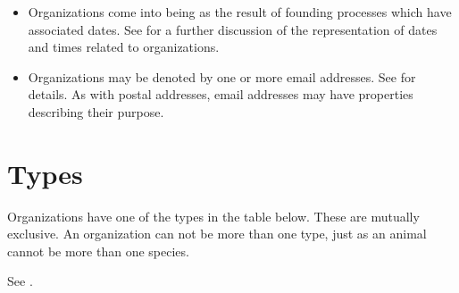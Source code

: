 \documentclass[letterpaper,10pt,english]{sphinxmanual}
\begin{document}
\begin{itemize}
\item {} 
\sphinxAtStartPar
Organizations come into being as the result of founding processes which have associated
dates.  See {\hyperref[\detokenize{datetimes::doc}]{}} for
a further discussion of the representation of dates and times related to organizations.

\item {} 
\sphinxAtStartPar
Organizations may be denoted by one or more email addresses.  See {\hyperref[\detokenize{addresses::doc}]{}} for details.  As with postal addresses, email addresses may have
properties describing their purpose.

\end{itemize}


\section{Types}
\label{\detokenize{organizations:types}}
\sphinxAtStartPar
Organizations have one of the types in the table below. These are mutually exclusive.
An organization can
not be more than one type, just as an animal cannot be more than one species.

\sphinxAtStartPar
See {\hyperref[\detokenize{organizations:table-1}]{}}.
\end{document}
